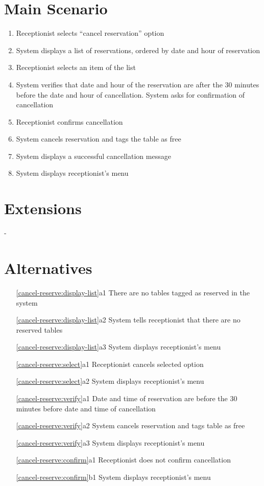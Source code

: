 \documentclass[a4paper,11pt,oneside]{book}
\newcommand{\cancel}[1]{#1 cancels selected option}
\newcommand{\menu}[1]{System displays #1's menu}
\begin{document}
\section{Main Scenario}

\begin{enumerate}
\item Receptionist selects ``cancel reservation'' option
\item \label{cancel-reserve:display-list}System displays a list of reservations, ordered by date and hour of reservation
\item \label{cancel-reserve:select}Receptionist selects an item of the list
\item \label{cancel-reserve:verify}System verifies that date and hour of the reservation are after the 30 minutes before the date and hour of cancellation. System asks for confirmation of cancellation
\item \label{cancel-reserve:confirm}Receptionist confirms cancellation
\item System cancels reservation and tags the table as free
\item System displays a successful cancellation message
\item \menu{receptionist}
\end{enumerate}

\section{Extensions}

-

\section{Alternatives}

\begin{enumerate}
  \item [\ref{cancel-reserve:display-list}a1] There are no tables tagged as reserved in the system
  \item [\ref{cancel-reserve:display-list}a2] System tells receptionist that there are no reserved tables
  \item [\ref{cancel-reserve:display-list}a3] \menu{receptionist}
    \\
  \item [\ref{cancel-reserve:select}a1] \cancel{Receptionist}
  \item [\ref{cancel-reserve:select}a2] \menu{receptionist}
    \\
  \item [\ref{cancel-reserve:verify}a1] Date and time of reservation are before the 30 minutes before date and time of cancellation
  \item [\ref{cancel-reserve:verify}a2] System cancels reservation and tags table as free
  \item [\ref{cancel-reserve:verify}a3] \menu{receptionist}
    \\
  \item [\ref{cancel-reserve:confirm}a1] Receptionist does not confirm cancellation
  \item [\ref{cancel-reserve:confirm}b1] \menu{receptionist}
\end{enumerate}
\end{document}
